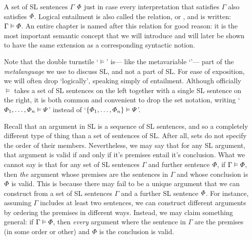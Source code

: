 A set of SL sentences $\Gamma$  $\varPhi$ just in case every interpretation that satisfies $\Gamma$ also satisfies $\varPhi$.
Logical entailment is also called the  relation, or , and is written: $\Gamma \vDash \varPhi$. 
An entire chapter is named after this relation for good reason: it is the most important semantic concept that we will introduce and will later be shown to have the same extension as a corresponding syntactic notion.

Note that the double turnstile `$\models$' is--- like the metavariable `\metaA{}'--- part of the \emph{metalanguage} we use to discuss SL, and not a part of SL.
For ease of exposition, we will often drop `logically', speaking simply of entailment.
Although officially $\models$ takes a set of SL sentences on the left together with a single SL sentence on the right, it is both common and convenient to drop the set notation, writing `$\varPhi_1,\ldots,\varPhi_n \vDash \varPsi$' instead of `$\lbrace\varPhi_1,\ldots,\varPhi_n\rbrace \vDash \varPsi$'.

Recall that an argument in SL is a sequence of SL sentences, and so a completely different type of thing than a set of sentences of SL.
After all, sets do not specify the order of their members.
Nevertheless, we may say that for any SL argument, that argument is valid if and only if it's premises entail it's conclusion.
What we cannot say is that for any set of SL sentences $\Gamma$ and further sentence $\varPhi$, if $\Gamma \vDash \varPhi$, then \textit{the} argument whose premises are the sentences in $\Gamma$ and whose conclusion is $\varPhi$ is valid.
This is because there may fail to be a unique argument that we can construct from a set of SL sentences $\Gamma$ and a further SL sentence $\varPhi$.
For instance, assuming $\Gamma$ includes at least two sentences, we can construct different arguments by ordering the premises in different ways.
Instead, we may claim something general: if $\Gamma \vDash \varPhi$, then \textit{every} argument where the sentence in $\Gamma$ are the premises (in some order or other) and $\varPhi$ is the conclusion is valid.

